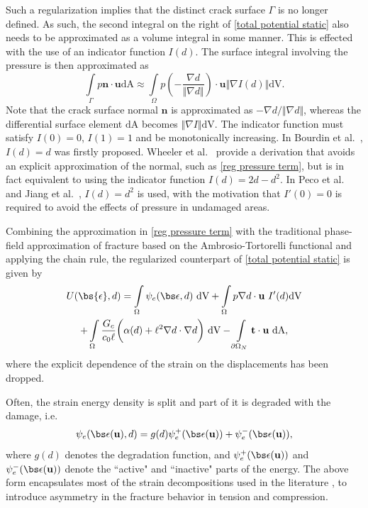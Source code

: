 Such a regularization implies that the distinct crack surface $\Gamma$ is no longer defined.  As such, the second integral on the right of \eqref{total potential static} also needs to be approximated as a volume integral in some manner.  This is effected with the use of an indicator function $I(d)$.  The surface integral involving the pressure is then approximated as
\begin{equation}\label{reg pressure term}
    \int\limits_{\Gamma} p\textbf{n}\cdot{\textbf{u}} \text{dA} \approx \int\limits_{\Omega} p \left( -\frac{\nabla d}{\Vert\nabla d\Vert} \right)\cdot{\textbf{u}} \Vert\nabla I(d)\Vert\text{dV}.
\end{equation}
Note that the crack surface normal $\textbf{n}$ is approximated as $-{\nabla d}/{\Vert\nabla d\Vert}$, whereas the differential surface element $\text{dA}$ becomes $\Vert\nabla I\Vert\text{dV}$.  The indicator function must satisfy $I(0)=0$, $I(1)=1$ and be monotonically increasing. In Bourdin et al.~\cite{bourdin2012variational}, $I(d)=d$ was firstly proposed. Wheeler et al.~\cite{wheeler2014augmented} provide a derivation that avoids an explicit approximation of the normal, such as \eqref{reg pressure term}, but is in fact equivalent to using the indicator function $I(d) = 2d - d^2$. In Peco et al.~\cite{peco2017influence} and Jiang et al.~\cite{jiang2022phase}, $I(d) = d^2$ is used, with the motivation that $I'(0) = 0$ is required to avoid the effects of pressure in undamaged areas.

Combining the approximation in \eqref{reg pressure term} with the traditional phase-field approximation of fracture based on the Ambrosio-Tortorelli functional \cite{bourdin2000numerical} and applying the chain rule, the regularized counterpart of \eqref{total potential static} is given by
\begin{multline}\label{total potential static pf}
    U(\bs{\epsilon},d) = \int\limits_{\Omega}\psi_e(\bs\epsilon,d)\ \text{dV} + \int\limits_{\Omega} p \nabla d\cdot\textbf{u}\ I'(d)\text{dV} \\ + \int\limits_{\Omega}\dfrac{G_c}{c_0\ell}\bigg( \alpha(d) + \ell^2\nabla d \cdot \nabla d\bigg)\ \text{dV} - \int\limits_{\partial \Omega_N} \textbf{t}\cdot\textbf{u} \ \text{dA},
\end{multline}
where the explicit dependence of the strain on the displacements has been dropped.  

Often, the strain energy density is split and part of it is degraded with the damage, i.e. 
\begin{equation}\label{energy split}
    \psi_e(\bs\epsilon(\textbf{u}),d) = g(d)\psi^+_e(\bs\epsilon(\textbf{u})) + \psi_e^-(\bs\epsilon(\textbf{u})),
\end{equation}
where $g(d)$ denotes the degradation function, and $\psi_e^+(\bs\epsilon(\textbf{u}))$ and $\psi_e^-(\bs\epsilon(\textbf{u}))$ denote the ``active" and ``inactive" parts of the energy. The above form encapsulates most of the strain decompositions used in the literature \cite{amor2009regularized},\cite{miehe2010phase} to introduce asymmetry in the fracture behavior in tension and compression.

